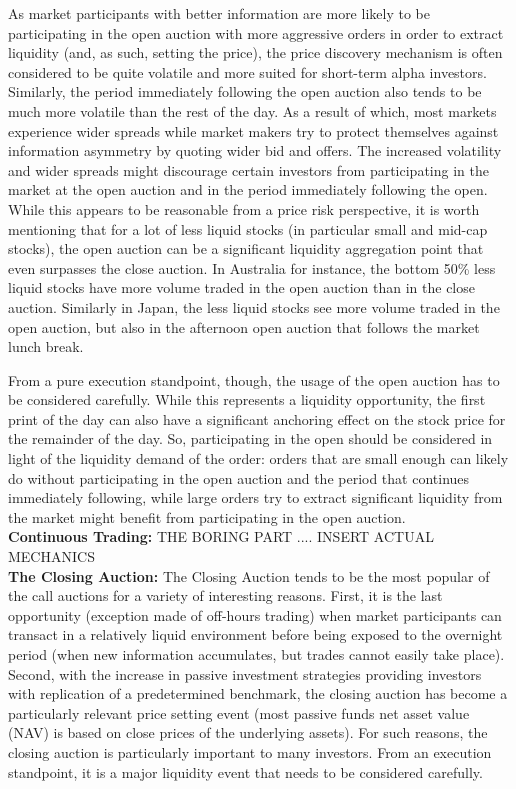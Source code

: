As market participants with better information are more likely to be participating in the open auction with more aggressive orders in order to extract liquidity (and, as such, setting the price), the price discovery mechanism is often considered to be quite volatile and more suited for short-term alpha investors. Similarly, the period immediately following the open auction also tends to be much more volatile than the rest of the day. As a result of which, most markets experience wider spreads while market makers try to protect themselves against information asymmetry by quoting wider bid and offers. The increased volatility and wider spreads might discourage certain investors from participating in the market at the open auction and in the period immediately following the open. While this appears to be reasonable from a price risk perspective, it is worth mentioning that for a lot of less liquid stocks (in particular small and mid-cap stocks), the open auction can be a significant liquidity aggregation point that even surpasses the close auction. In Australia for instance, the bottom 50\% less liquid stocks have more volume traded in the open auction than in the close auction. Similarly in Japan, the less liquid stocks see more volume traded in the open auction, but also in the afternoon open auction that follows the market lunch break.


From a pure execution standpoint, though, the usage of the open auction has to be considered carefully. While this represents a liquidity opportunity, the first print of the day can also have a significant anchoring effect on the stock price for the remainder of the day. So, participating in the open should be considered in light of the liquidity demand of the order: orders that are small enough can likely do without participating in the open auction and the period that continues immediately following, while large orders try to extract significant liquidity from the market might benefit from participating in the open auction. \\



\noindent\textbf{Continuous Trading:} THE BORING PART .... INSERT ACTUAL MECHANICS \\


\noindent\textbf{The Closing Auction:} The Closing Auction tends to be the most popular of the call auctions for a variety of interesting reasons. First, it is the last opportunity (exception made of off-hours trading) when market participants can transact in a relatively liquid environment before being exposed to the overnight period (when new information accumulates, but trades cannot easily take place). Second, with the increase in passive investment strategies providing investors with replication of a predetermined benchmark, the closing auction has become a particularly relevant price setting event (most passive funds net asset value (NAV) is based on close prices of the underlying assets). For such reasons, the closing auction is particularly important to many investors. From an execution standpoint, it is a major liquidity event that needs to be considered carefully. \\


